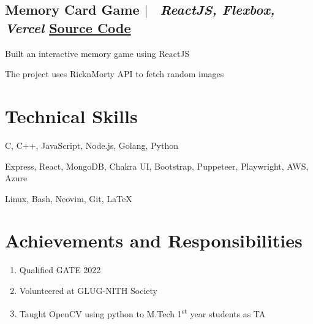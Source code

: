 \documentclass[10pt]{article}
\begin{document}
\subsection*{
  Memory Card Game 
  $|$ 
  \normalsize \normalfont \ \textit{ReactJS, Flexbox, Vercel }
  \hfill
  \normalsize \href{https://github.com/harsh-sheth/memory_card_game}{Source Code}
}
  \begin{description}
    \setlength{\itemsep}{0em}
    \setlength{\itemindent}{2\parindent}
    \item[$\bullet$]{Built an interactive memory game using ReactJS}
    \item[$\bullet$]{The project uses RicknMorty API to fetch random images}
  \end{description}




\section{Technical Skills}
\begin{description}
  \setlength{\itemindent}{\parindent}
  \setlength{\itemsep}{0em}
  \item[Languages:]{C, C++, JavaScript, Node.js, Golang, Python}
  \item[Web Technologies:]{Express, React, MongoDB, Chakra UI, Bootstrap, Puppeteer, Playwright, AWS, Azure}
  \item[Tools:]{Linux, Bash, Neovim, Git, \LaTeX}
\end{description}


\section{Achievements and Responsibilities}
\begin{enumerate}
  \setlength{\itemsep}{0em}
  \item Qualified GATE 2022
  \item Volunteered at GLUG-NITH Society
  \item Taught OpenCV using python to M.Tech 1\textsuperscript{st} year students as TA
\end{enumerate}
\end{document}
